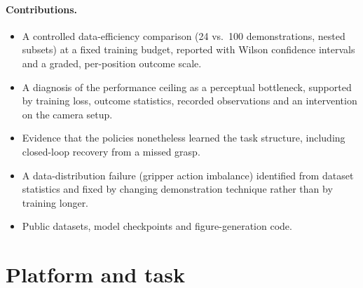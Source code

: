 \documentclass[11pt,a4paper]{article}
\begin{document}
\paragraph{Contributions.}
\begin{itemize}
  \item A controlled data-efficiency comparison (24 vs.\ 100 demonstrations,
        nested subsets) at a fixed training budget, reported with Wilson
        confidence intervals and a graded, per-position outcome scale.
  \item A diagnosis of the performance ceiling as a perceptual bottleneck,
        supported by training loss, outcome statistics, recorded observations
        and an intervention on the camera setup.
  \item Evidence that the policies nonetheless learned the task structure,
        including closed-loop recovery from a missed grasp.
  \item A data-distribution failure (gripper action imbalance) identified from
        dataset statistics and fixed by changing demonstration technique rather
        than by training longer.
  \item Public datasets, model checkpoints and figure-generation code.
\end{itemize}

\section{Platform and task}
\end{document}
